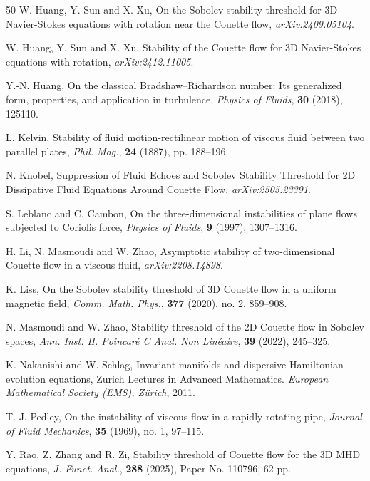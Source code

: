 \documentclass[11pt,reqno]{article}
\numberwithin{equation}{section}
\begin{document}
\begin{thebibliography}{50}
W. Huang, Y. Sun and X. Xu, 
On the Sobolev stability threshold for 3D Navier-Stokes equations with rotation near the Couette flow, \textit{arXiv:2409.05104}.

W. Huang, Y. Sun and X. Xu, 	Stability of the Couette flow for 3D Navier-Stokes equations with rotation, \textit{arXiv:2412.11005}.


Y.-N. Huang, 
On the classical Bradshaw–Richardson number: Its generalized form, properties, and application in turbulence,
\textit{Physics of Fluids}, \textbf{30} (2018), 125110.

 L. Kelvin, Stability of fluid motion-rectilinear motion of viscous fluid between two parallel plates, \textit{Phil.
	Mag.}, \textbf{24} (1887), pp. 188–196.		

N. Knobel,
Suppression of Fluid Echoes and Sobolev Stability Threshold for 2D Dissipative Fluid Equations Around Couette Flow,
\textit{arXiv:2505.23391}.

S. Leblanc and C. Cambon, 
On the three-dimensional instabilities of plane flows subjected to Coriolis force, \textit{Physics of Fluids}, \textbf{9} (1997), 1307--1316.


	H. Li, N. Masmoudi and W. Zhao, Asymptotic stability of two-dimensional Couette flow in a viscous fluid, \textit{arXiv:2208.14898}.	

K. Liss,
On the Sobolev stability threshold of 3D Couette flow in a uniform magnetic field,
\textit{Comm. Math. Phys.}, \textbf{377} (2020), no. 2, 859--908.

 N. Masmoudi and W. Zhao, Stability threshold of the 2D Couette flow in Sobolev spaces, \textit{Ann. Inst. H.
	Poincaré C Anal. Non Linéaire}, \textbf{39} (2022), 245--325.



K. Nakanishi and W. Schlag, 
Invariant manifolds and dispersive Hamiltonian evolution equations,
Zurich Lectures in Advanced Mathematics.
\textit{ European Mathematical Society (EMS), Z\"urich}, 2011.




T. J. Pedley, 
On the instability of viscous flow in a rapidly rotating pipe, 
\textit{Journal of Fluid Mechanics}, \textbf{35} (1969), no. 1, 97--115.

	 Y. Rao, Z. Zhang and R. Zi, Stability threshold of Couette flow for the 3D MHD equations,
\textit{J. Funct. Anal.}, \textbf{288} (2025),  Paper No. 110796, 62 pp.


\end{thebibliography}
\end{document}

